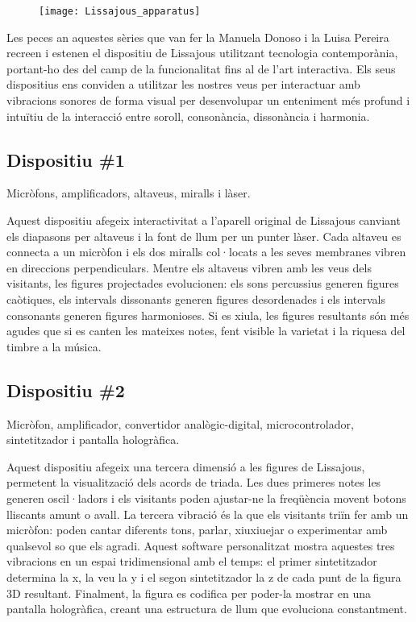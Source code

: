 \begin{figure}[!h]
\centering
\texttt{[image: Lissajous\_apparatus]}
\end{figure}

Les peces an aquestes sèries que van fer la Manuela Donoso i la Luisa Pereira recreen i estenen el dispositiu de Lissajous utilitzant tecnologia contemporània, portant-ho des del camp de la funcionalitat fins al de l'art interactiva. Els seus dispositius ens conviden a utilitzar les nostres veus per interactuar amb vibracions sonores de forma visual per desenvolupar un enteniment més profund i intuïtiu de la interacció entre soroll, consonància, dissonància i harmonia.



\subsection{Dispositiu \#1}
Micròfons, amplificadors, altaveus, miralls i làser.

Aquest dispositiu afegeix interactivitat a l'aparell original de Lissajous canviant els diapasons per altaveus i la font de llum per un punter làser. Cada altaveu es connecta a un micròfon i els dos miralls col·locats a les seves membranes vibren en direccions perpendiculars. Mentre els altaveus vibren amb les veus dels visitants, les figures projectades evolucionen: els sons percussius generen figures caòtiques, els intervals dissonants generen figures desordenades i els intervals consonants generen figures harmonioses. Si es xiula, les figures resultants són més agudes que si es canten les mateixes notes, fent visible la varietat i la riquesa del timbre a la música.

\subsection{Dispositiu \#2}
Micròfon, amplificador, convertidor analògic-digital, microcontrolador, sintetitzador i pantalla hologràfica.

Aquest dispositiu afegeix una tercera dimensió a les figures de Lissajous, permetent la visualització dels acords de triada. Les dues primeres notes les generen oscil·ladors i els visitants poden ajustar-ne la freqüència movent botons lliscants amunt o avall. La tercera vibració és la que els visitants triïn fer amb un micròfon: poden cantar diferents tons, parlar, xiuxiuejar o experimentar amb qualsevol so que els agradi. Aquest software personalitzat mostra aquestes tres vibracions en un espai tridimensional amb el temps: el primer sintetitzador determina la x, la veu la y i el segon sintetitzador la z de cada punt de la figura 3D resultant. Finalment, la figura es codifica per poder-la mostrar en una pantalla hologràfica, creant una estructura de llum que evoluciona constantment.

